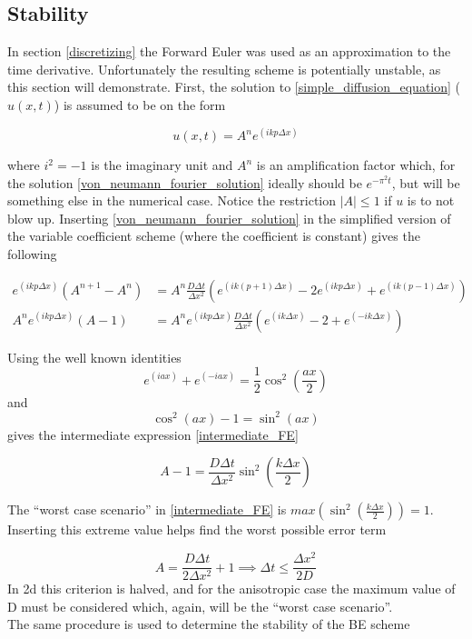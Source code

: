 \subsection{Stability}\label{stability}

In section \ref{discretizing} the Forward Euler was used as an approximation to the time derivative. 
Unfortunately the resulting scheme is potentially unstable, as this section will demonstrate. 
First, the solution to \eqref{simple_diffusion_equation} ($u(x,t)$) is assumed to be on the form 

\begin{equation}\label{von_neumann_fourier_solution}
 u(x,t) = A^n e^{(ikp\Delta x)}
\end{equation}

where $i^2=-1$ is the imaginary unit and $A^n$ is an amplification factor which, for the solution \eqref{von_neumann_fourier_solution} ideally should be $e^{-\pi^2t}$, but will be something else in the numerical case. 
Notice the restriction $\left|A\right|\leq 1$ if $u$ is to not blow up. 
Inserting \eqref{von_neumann_fourier_solution} in the simplified version of the variable coefficient scheme (where the coefficient is constant) gives the following

\begin{align*}
 e^{(ikp\Delta x)}\left(A^{n+1}-A^n\right) &=  A^n\frac{D\Delta t}{\Delta x^2}\left(e^{(ik(p+1)\Delta x)}-2e^{(ikp\Delta x)} +e^{(ik(p-1)\Delta x)}\right)\\
  A^ne^{(ikp\Delta x)}\left(A-1\right) &=   A^ne^{(ikp\Delta x)}\frac{D\Delta t}{\Delta x^2}\left(e^{(ik\Delta x)} -2  + e^{(-ik\Delta x)}\right)
  \end{align*}
  
Using the well known identities
$$e^{(iax)}+e^{(-iax)} = \frac{1}{2}\cos^2\left(\frac{ax}{2}\right)$$
and 
$$\cos^2(ax)-1 = \sin^2(ax)$$
gives the intermediate expression \eqref{intermediate_FE}

\begin{equation}\label{intermediate_FE}
 A-1 = \frac{D\Delta t}{\Delta x^2}\sin^2\left(\frac{k\Delta x}{2}\right)
\end{equation}

The ``worst case scenario'' in \eqref{intermediate_FE} is  $max(\sin^2\left(\frac{k\Delta x}{2}\right))= 1$. Inserting this extreme value helps find the worst possible error term

\begin{equation}
 A = \frac{D\Delta t}{2\Delta x^2}+1 \implies \Delta t\leq\frac{\Delta x^2}{2D}
\end{equation}
In 2d this criterion is halved, and for the anisotropic case the maximum value of D must be considered which, again, will be the ``worst case scenario''.\\
The same procedure is used to determine the stability of the BE scheme


